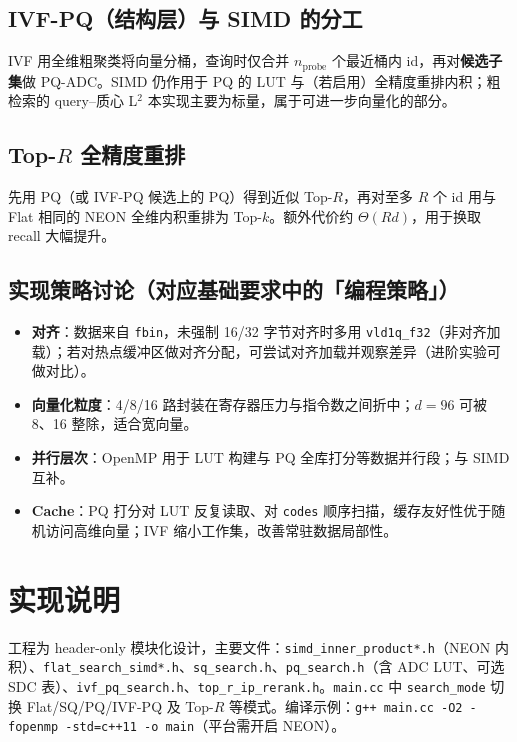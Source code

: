 \documentclass[UTF8,a4paper,11pt]{ctexart}
\begin{document}
\subsection{IVF-PQ（结构层）与 SIMD 的分工}

IVF 用全维粗聚类将向量分桶，查询时仅合并 $n_{\mathrm{probe}}$ 个最近桶内 id，再对\textbf{候选子集}做 PQ-ADC。SIMD 仍作用于 PQ 的 LUT 与（若启用）全精度重排内积；粗检索的 query--质心 L$^2$ 本实现主要为标量，属于可进一步向量化的部分。

\subsection{Top-$R$ 全精度重排}

先用 PQ（或 IVF-PQ 候选上的 PQ）得到近似 Top-$R$，再对至多 $R$ 个 id 用与 Flat 相同的 NEON 全维内积重排为 Top-$k$。额外代价约 $\Theta(R d)$，用于换取 recall 大幅提升。

\subsection{实现策略讨论（对应基础要求中的「编程策略」）}

\begin{itemize}[leftmargin=*]
  \item \textbf{对齐}：数据来自 \texttt{fbin}，未强制 16/32 字节对齐时多用 \texttt{vld1q\_f32}（非对齐加载）；若对热点缓冲区做对齐分配，可尝试对齐加载并观察差异（进阶实验可做对比）。
  \item \textbf{向量化粒度}：4/8/16 路封装在寄存器压力与指令数之间折中；$d=96$ 可被 8、16 整除，适合宽向量。
  \item \textbf{并行层次}：OpenMP 用于 LUT 构建与 PQ 全库打分等数据并行段；与 SIMD 互补。
  \item \textbf{Cache}：PQ 打分对 LUT 反复读取、对 \texttt{codes} 顺序扫描，缓存友好性优于随机访问高维向量；IVF 缩小工作集，改善常驻数据局部性。
\end{itemize}

\section{实现说明}
\label{sec:impl}

工程为 header-only 模块化设计，主要文件：\texttt{simd\_inner\_product*.h}（NEON 内积）、\texttt{flat\_search\_simd*.h}、\texttt{sq\_search.h}、\texttt{pq\_search.h}（含 ADC LUT、可选 SDC 表）、\texttt{ivf\_pq\_search.h}、\texttt{top\_r\_ip\_rerank.h}。\texttt{main.cc} 中 \texttt{search\_mode} 切换 Flat/SQ/PQ/IVF-PQ 及 Top-$R$ 等模式。编译示例：\texttt{g++ main.cc -O2 -fopenmp -std=c++11 -o main}（平台需开启 NEON）。
\end{document}
